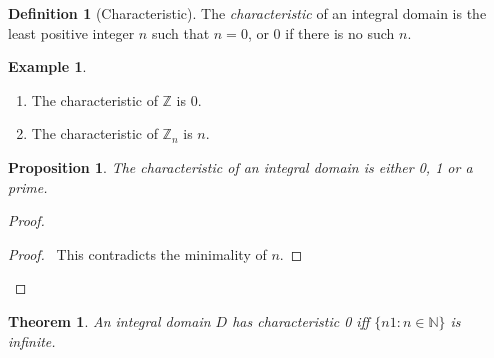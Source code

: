 \documentclass{article}
\let\qed\relax
\newtheorem{proposition}[axiom]{Proposition}
\newtheorem{theorem}[axiom]{Theorem}
\theoremstyle{definition}
\newtheorem{definition}[axiom]{Definition}
\newtheorem{example}[axiom]{Example}
\begin{document}
    \begin{definition}[Characteristic]
        The \emph{characteristic} of an integral domain is the least positive integer $n$ such that $n = 0$,
        or 0 if there is no such $n$.
    \end{definition}

    \begin{example}
        \begin{enumerate}
            \item The characteristic of $\mathbb{Z}$ is 0.
            \item The characteristic of $\mathbb{Z}_n$ is $n$.
        \end{enumerate}
    \end{example}

    \begin{proposition}
        The characteristic of an integral domain is either 0, 1 or a prime.
    \end{proposition}

    \begin{proof}
        \pf
        \qedstep
        \begin{proof}
            \pf\ This contradicts the minimality of $n$.
        \end{proof}
        \qed
    \end{proof}

    \begin{theorem}
        An integral domain $D$ has characteristic 0 iff $\{ n1 : n \in \mathbb{N} \}$ is infinite.
    \end{theorem}
\end{document}
